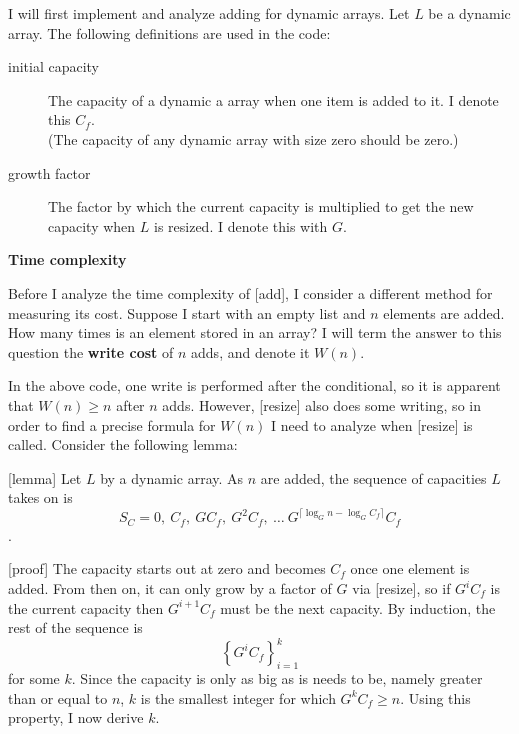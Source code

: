 \documentclass{article}
\newcommand{\tcomplex}{\textbf{Time complexity}}
\newcommand{\nwritesfn}{W}
\newcommand{\varnitems}{n}
\newcommand{\listname}{L}
\newcommand{\initcapacity}{C_f}
\newcommand{\growthfactor}{G}
\begin{document}
	I will first implement and analyze adding for dynamic arrays. Let $\listname$ be a dynamic array. The following definitions are used in the code:
	
	\begin{description}
		\item[initial capacity] The capacity of a dynamic a array when one item is added to it. I denote this $\initcapacity$.\\
		(The capacity of any dynamic array with size zero should be zero.)
		\item[growth factor] The factor by which the current capacity is multiplied to get the new capacity when $\listname$ is resized. I denote this with $\growthfactor$.
	\end{description}
	
	
	\tcomplex
	
	Before I analyze the time complexity of [add], I consider a different method for measuring its cost. Suppose I start with an empty list and $\varnitems$ elements are added. How many times is an element stored in an array? I will term the answer to this question the \textbf{write cost} of $\varnitems$ adds, and denote it $\nwritesfn(n)$.
	
	In the above code, one write is performed after the conditional, so it is apparent that $\nwritesfn(\varnitems) \geq \varnitems$ after $n$ adds. However, [resize] also does some writing, so in order to find a precise formula for $\nwritesfn(\varnitems)$ I need to analyze when [resize] is called. Consider the following lemma:
	
	[lemma]
	Let $\listname$ by a dynamic array. As $\varnitems$ are added, the sequence of capacities $\listname$ takes on is $$S_C = 0,\ \initcapacity,\ \growthfactor\initcapacity,\ \growthfactor^2\initcapacity,\ \ldots\ \growthfactor^{\lceil \log_{\growthfactor} \varnitems - \log_{\growthfactor} \initcapacity \rceil}\initcapacity$$.
	
	[proof]
	The capacity starts out at zero and becomes $\initcapacity$ once one element is added. From then on, it can only grow by a factor of $\growthfactor$ via [resize], so if $\growthfactor^i\initcapacity$ is the current capacity then $\growthfactor^{i + 1}\initcapacity$ must be the next capacity. By induction, the rest of the sequence is $$\left\{ \growthfactor^i\initcapacity \right\}_{i = 1}^k$$ for some $k$. Since the capacity is only as big as is needs to be, namely greater than or equal to $\varnitems$, $k$ is the smallest integer for which $\growthfactor^k\initcapacity \geq \varnitems$. Using this property, I now derive $k$.
	
\end{document}
